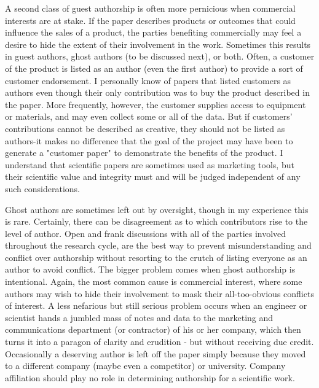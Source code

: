 A second class of guest authorship is often more pernicious when commercial interests are at stake. If the paper describes products or outcomes that could influence the sales of a product, the parties benefiting commercially may feel a desire to hide the extent of their involvement in the work. Sometimes this results in guest authors, ghost authors (to be discussed next), or both. Often, a customer of the product is listed as an author (even the first author) to provide a sort of customer endorsement. I personally know of papers that listed customers as authors even though their only contribution was to buy the product described in the paper. More frequently, however, the customer supplies access to equipment or materials, and may even collect some or all of the data. But if customers' contributions cannot be described as creative, they should not be listed as authors-it makes no difference that the goal of the project may have been to generate a "customer paper" to demonstrate the benefits of the product. I understand that scientific papers are sometimes used as marketing tools, but their scientific value and integrity must and will be judged independent of any such considerations.

Ghost authors are sometimes left out by oversight, though in my experience this is rare. Certainly, there can be disagreement as to which contributors rise to the level of author. Open and frank discussions with all of the parties involved throughout the research cycle, are the best way to prevent misunderstanding and conflict over authorship without resorting to the crutch of listing everyone as an author to avoid conflict. The bigger problem comes when ghost authorship is intentional. Again, the most common cause is commercial interest, where some authors may wish to hide their involvement to mask their all-too-obvious conflicts of interest. A less nefarious but still serious problem occurs when an engineer or scientist hands a jumbled mass of notes and data to the marketing and communications department (or contractor) of his or her company, which then turns it into a paragon of clarity and erudition - but without receiving due credit. Occasionally a deserving author is left off the paper simply because they moved to a different company (maybe even a competitor) or university. Company affiliation should play no role in determining authorship for a scientific work.

